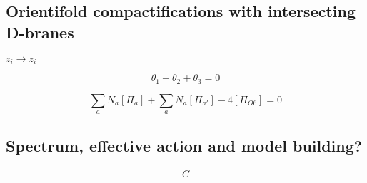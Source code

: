 \subsection{Orientifold compactifications with intersecting D-branes}

$z_i \to \bar z_i$

\begin{equation}
  \theta_1 + \theta_2 + \theta_3 = 0
\end{equation}

\begin{equation}
  \sum_a N_a [\Pi_a] + \sum_a N_{a} [\Pi_{a'}] - 4 [\Pi_{O6}]=0
\end{equation}

\subsection{Spectrum, effective action and model building?}

\begin{equation}
\begin{aligned}
C  
\end{aligned}
\end{equation}
